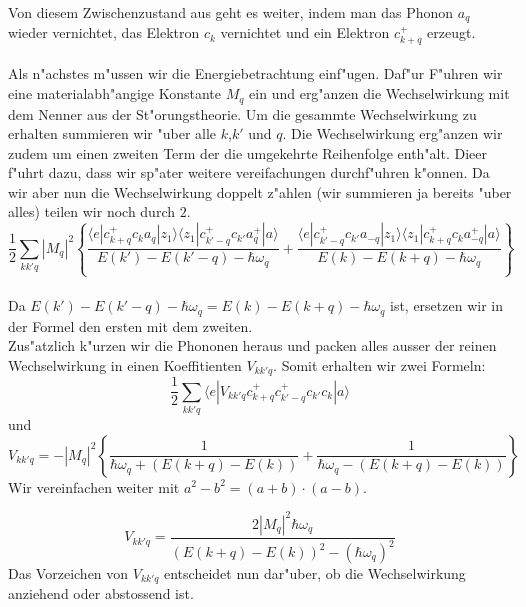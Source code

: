 \begin{refsection}
Von diesem Zwischenzustand aus geht es weiter, indem man das Phonon $a_q$ wieder vernichtet, das Elektron $c_k$ vernichtet und ein Elektron $c^+_{k+q}$ erzeugt.
\\
\\
Als n"achstes m"ussen wir die Energiebetrachtung einf"ugen. Daf"ur F"uhren wir eine materialabh"angige Konstante $M_q$ ein und erg"anzen die Wechselwirkung mit dem Nenner aus der St"orungstheorie.
Um die gesammte Wechselwirkung zu erhalten summieren wir "uber alle $k$,$k'$ und $q$. Die Wechselwirkung erg"anzen wir zudem um einen zweiten Term der die umgekehrte Reihenfolge enth"alt. Dieer f"uhrt dazu, dass wir sp"ater weitere vereifachungen durchf"uhren k"onnen. Da wir aber nun die Wechselwirkung doppelt z"ahlen (wir summieren ja bereits "uber alles) teilen wir noch durch $2$.
\\
\begin{equation}
\frac{1}{2}
\sum \limits_{kk'q} |M_q|^2
\left\{
\frac
{\langle e|c^+_{k+q} c_k a_q |z_1\rangle\langle z_1| c^+_{k'-q} c_{k'} a^+_q |a\rangle }
{E(k')-E(k'-q)-\hbar\omega_q}
+
\frac
{\langle e|c^+_{k'-q} c_{k'} a_{-q}|z_1\rangle\langle z_1| c^+_{k+q} c_k a^+_{-q} |a\rangle }
{E(k)-E(k+q)-\hbar\omega_q}
\right\}
\label{supraleitung:WechelwirkungME}
\end{equation}
\\
Da $E(k')-E(k'-q)-\hbar\omega_q = E(k)-E(k+q)-\hbar\omega_q$ ist, ersetzen wir in der Formel den ersten mit dem zweiten.
\\
Zus"atzlich k"urzen wir die Phononen heraus und packen alles ausser der reinen Wechselwirkung in einen Koeffitienten $V_{kk'q}$. Somit erhalten wir zwei Formeln:
\begin{equation}
\frac{1}{2}
\sum \limits_{kk'q} 
\langle e|V_{kk'q}c^+_{k+q}c^+_{k'-q}c_{k'}c_k|a \rangle
\label{supraleitung:WechelwirkungKurz}
\end{equation}
und
\begin{equation}
V_{kk'q} = - |M_q|^2 \left\{\frac{1}{\hbar\omega_q+(E(k+q)-E(k))}
+
\frac{1}{\hbar\omega_q-(E(k+q)-E(k))}
\right\}
\label{supraleitung:WechelwirkungVkk'q}
\end{equation}
Wir vereinfachen weiter mit $a^2-b^2 = (a+b)\cdot(a-b)$.

\begin{equation}
V_{kk'q} =
\frac
{2|M_q|^2\hbar\omega_q}
{(E(k+q)-E(k))^2-(\hbar\omega_q)^2}
\label{supraleitung:Wechelwirkung_Vkk'q_Kurz}
\end{equation}
Das Vorzeichen von $V_{kk'q}$ entscheidet nun dar"uber, ob die Wechselwirkung anziehend oder abstossend ist.\\


\end{refsection}
